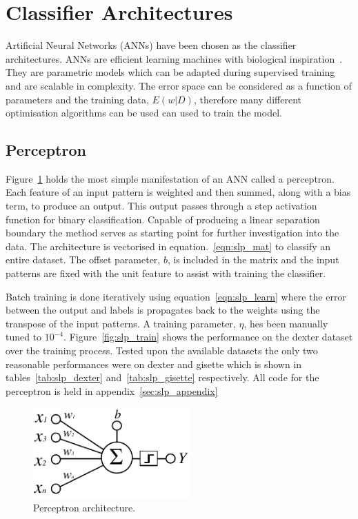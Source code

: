 \documentclass{ecsarticle}     %
\begin{document}
\section{Classifier Architectures}

Artificial Neural Networks (ANNs) have been chosen as the classifier architectures.
ANNs are efficient learning machines with biological inspiration~\citep{bishop06pattern}. 
They are parametric models which can be adapted during supervised training and are scalable in complexity.
The error space can be considered as a function of parameters and the training data, $E(w|D)$, therefore many different optimisation algorithms can be used can used to train the model. 



\subsection{Perceptron}
\label{sec:perceptron}

Figure~\ref{fig:slp} holds the most simple manifestation of an ANN called a perceptron.
Each feature of an input pattern is weighted and then summed, along with a bias term, to produce an output.
This output passes through a step activation function for binary classification.
Capable of producing a linear separation boundary the method serves as starting point for further investigation into the data.
The architecture is vectorised in equation.~\eqref{eqn:slp_mat} to classify an entire dataset. 
The offset parameter, $b$, is included in the matrix and the input patterns are fixed with the unit feature to assist with training the classifier. 

Batch training is done iteratively using equation~\eqref{eqn:slp_learn} where the error between the output and labels is propagates back to the weights using the transpose of the input patterns.
A training parameter, $\eta$, hes been manually tuned to $10^{-4}$.
Figure~\ref{fig:slp_train} shows the performance on the dexter dataset over the training process.
Tested upon the available datasets the only two reasonable performances were on dexter and gisette which is shown in tables~\ref{tab:slp_dexter} and~\ref{tab:slp_gisette} respectively.
All code for the perceptron is held in appendix~\ref{sec:slp_appendix}

\begin{figure}[ht]
   \centering
    \includegraphics[width = 6cm]{SLP.pdf}
   \caption{Perceptron architecture.}
   \label{fig:slp}
\end{figure}
\end{document}
